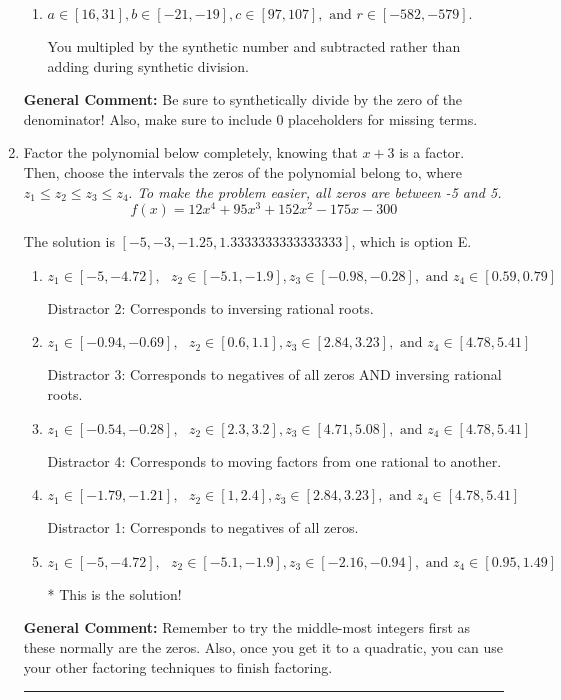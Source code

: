 \documentclass{extbook}[14pt]
\newcommand{\litem}[1]{\item #1

\rule{\textwidth}{0.4pt}}
\begin{document}
\begin{enumerate}
{\begin{enumerate}[label=\Alph*.]
 You multipled by the synthetic number rather than bringing the first factor down.
\item \( a \in [16, 31], b \in [-21, -19], c \in [97, 107], \text{ and } r \in [-582, -579]. \)

 You multipled by the synthetic number and subtracted rather than adding during synthetic division.
\end{enumerate}

\textbf{General Comment:} Be sure to synthetically divide by the zero of the denominator! Also, make sure to include 0 placeholders for missing terms.
}
\litem{
Factor the polynomial below completely, knowing that $x+3$ is a factor. Then, choose the intervals the zeros of the polynomial belong to, where $z_1 \leq z_2 \leq z_3 \leq z_4$. \textit{To make the problem easier, all zeros are between -5 and 5.}
\[ f(x) = 12x^{4} +95 x^{3} +152 x^{2} -175 x -300 \]

The solution is \( [-5, -3, -1.25, 1.3333333333333333] \), which is option E.\begin{enumerate}[label=\Alph*.]
\item \( z_1 \in [-5, -4.72], \text{   }  z_2 \in [-5.1, -1.9], z_3 \in [-0.98, -0.28], \text{   and   } z_4 \in [0.59, 0.79] \)

 Distractor 2: Corresponds to inversing rational roots.
\item \( z_1 \in [-0.94, -0.69], \text{   }  z_2 \in [0.6, 1.1], z_3 \in [2.84, 3.23], \text{   and   } z_4 \in [4.78, 5.41] \)

 Distractor 3: Corresponds to negatives of all zeros AND inversing rational roots.
\item \( z_1 \in [-0.54, -0.28], \text{   }  z_2 \in [2.3, 3.2], z_3 \in [4.71, 5.08], \text{   and   } z_4 \in [4.78, 5.41] \)

 Distractor 4: Corresponds to moving factors from one rational to another.
\item \( z_1 \in [-1.79, -1.21], \text{   }  z_2 \in [1, 2.4], z_3 \in [2.84, 3.23], \text{   and   } z_4 \in [4.78, 5.41] \)

 Distractor 1: Corresponds to negatives of all zeros.
\item \( z_1 \in [-5, -4.72], \text{   }  z_2 \in [-5.1, -1.9], z_3 \in [-2.16, -0.94], \text{   and   } z_4 \in [0.95, 1.49] \)

* This is the solution!
\end{enumerate}

\textbf{General Comment:} Remember to try the middle-most integers first as these normally are the zeros. Also, once you get it to a quadratic, you can use your other factoring techniques to finish factoring.
}
\end{enumerate}
\end{document}
